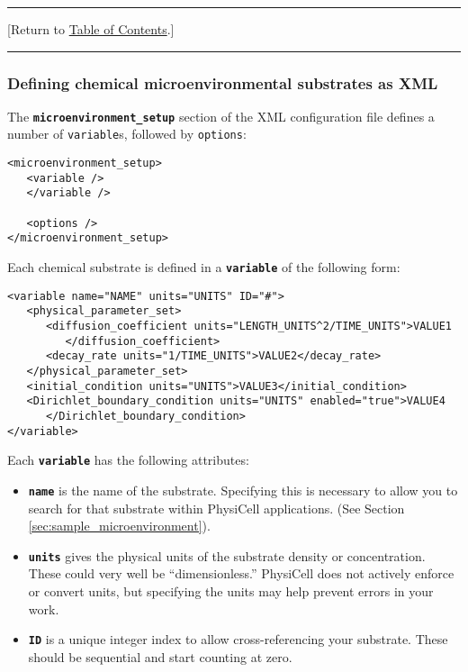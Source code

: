 \documentclass[12pt]{article}
\newcommand{\smallcode}[1]{\textbf{\texttt{#1}}}
\newcommand{\TOClink}{\begin{center}\hrule\vskip-5pt\phantom{.}\hfill[Return to \hyperlink{TOC}{Table of Contents}.]\hfill\phantom{.}\vskip3pt\hrule\end{center}}
\begin{document}
\TOClink 
\subsubsection{Defining chemical microenvironmental substrates as XML}
\label{sec:XML_microenvironment_setup_XML_structure}
The \smallcode{microenvironment\_setup} section of the XML configuration file 
defines a number of \verb+variable+s, followed by \verb+options+:

\begin{verbatim}
<microenvironment_setup>
   <variable />
   </variable />
 
   <options />
</microenvironment_setup>
\end{verbatim}

Each chemical substrate is defined in a \smallcode{variable} of the following form: 
\begin{verbatim}
<variable name="NAME" units="UNITS" ID="#">
   <physical_parameter_set>
      <diffusion_coefficient units="LENGTH_UNITS^2/TIME_UNITS">VALUE1
         </diffusion_coefficient>
      <decay_rate units="1/TIME_UNITS">VALUE2</decay_rate>  
   </physical_parameter_set>
   <initial_condition units="UNITS">VALUE3</initial_condition>
   <Dirichlet_boundary_condition units="UNITS" enabled="true">VALUE4
      </Dirichlet_boundary_condition>
</variable>
\end{verbatim}
Each \smallcode{variable} has the following attributes: 
\begin{itemize}
\item \smallcode{name} is the name of the substrate. Specifying this is necessary to allow you to search 
for that substrate within PhysiCell applications. (See Section \ref{sec:sample_microenvironment}). 
\item \smallcode{units} gives the physical units of the substrate density or concentration. These could very well be ``dimensionless.'' 
PhysiCell does not actively enforce or convert units, but specifying the units may help prevent errors in your work. 
\item \smallcode{ID} is a unique integer index to allow cross-referencing your substrate. These should be sequential and 
start counting at zero. 
\end{itemize}
\end{document}
